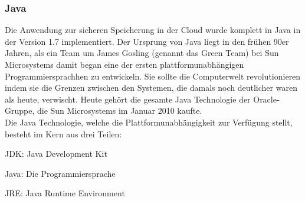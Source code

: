 \documentclass[12pt,a4paper,bibliography=totocnumbered,listof=totocnumbered]{scrartcl}
\begin{document}
\subsubsection{Java}
Die Anwendung zur sicheren Speicherung in der Cloud wurde komplett in Java in der Version 1.7 implementiert. Der Ursprung von Java liegt in den frühen 90er Jahren, als ein Team um James Gosling (genannt das Green Team) bei Sun Microsystems damit began eine der ersten plattformunabhängigen Programmiersprachhen zu entwickeln. Sie sollte die Computerwelt revolutionieren indem sie die Grenzen zwischen den Systemen, die damals noch deutlicher waren als heute, verwischt. Heute gehört die gesamte Java Technologie der Oracle-Gruppe, die Sun Microsystems im Januar 2010 kaufte.\\
Die Java Technologie, welche die Plattformunabhängigkeit zur Verfügung stellt, besteht im Kern aus drei Teilen:
\begin{compactitem}
	\item JDK: Java Development Kit
	\item Java: Die Programmiersprache
	\item JRE: Java Runtime Environment
\end{compactitem}
\end{document}

